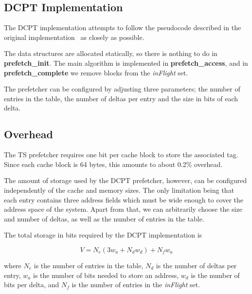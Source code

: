 \subsection{DCPT Implementation}



The DCPT implementation attempts to follow the pseudocode described in the
original implementation~\cite{dcpt} as closely as possible.

The data structures are allocated statically, so there is nothing to do in
\textbf{prefetch\_init}. The main algorithm is implemented in
\textbf{prefetch\_access}, and in \textbf{prefetch\_complete} we remove blocks
from the \emph{inFlight} set.


The prefetcher can be configured by adjusting three parameters; the number of
entries in the table, the number of deltas per entry and the size in bits of
each delta.

\subsection{Overhead}

The TS prefetcher requires one bit per cache block to store the
associated tag. Since each cache block is 64 bytes, this amounts to about 0.2\%
overhead.

The amount of storage used by the DCPT prefetcher, however, can be configured
independently of the cache and memory sizes. The only limitation being that each
entry contains three address fields which must be wide enough to cover the
address space of the system. Apart from that, we can arbitrarily choose the size
and number of deltas, as well as the number of entries in the table.

The total storage in bits required by the DCPT implementation is

\begin{equation*}
V = N_e (3 w_a + N_d w_d) + N_f w_a
\end{equation*} 

where $N_e$ is the number of entries in the table, $N_d$ is the number of deltas
per entry, $w_a$ is the number of bits needed to store an address, $w_d$ is the
number of bits per delta, and $N_f$ is the number of entries in the \emph{inFlight}
set.

